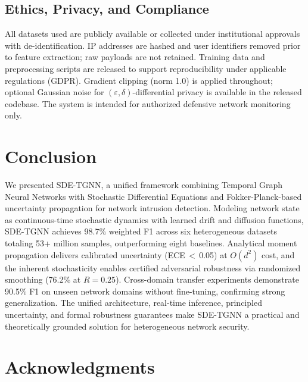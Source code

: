 \documentclass[10pt,journal,compsoc]{IEEEtran}
\begin{document}
\vspace{-0.2cm}
\subsection{Ethics, Privacy, and Compliance}

All datasets used are publicly available or collected under institutional approvals with de-identification. IP addresses are hashed and user identifiers removed prior to feature extraction; raw payloads are not retained. Training data and preprocessing scripts are released to support reproducibility under applicable regulations (GDPR). Gradient clipping (norm 1.0) is applied throughout; optional Gaussian noise for $(\varepsilon,\delta)$-differential privacy is available in the released codebase. The system is intended for authorized defensive network monitoring only.

\vspace{-0.2cm}
\section{Conclusion}
\label{sec:conclusion}

We presented SDE-TGNN, a unified framework combining Temporal Graph Neural Networks with Stochastic Differential Equations and Fokker-Planck-based uncertainty propagation for network intrusion detection. Modeling network state as continuous-time stochastic dynamics with learned drift and diffusion functions, SDE-TGNN achieves 98.7\% weighted F1 across six heterogeneous datasets totaling 53+ million samples, outperforming eight baselines. Analytical moment propagation delivers calibrated uncertainty (ECE\,$<$\,0.05) at $O(d^2)$ cost, and the inherent stochasticity enables certified adversarial robustness via randomized smoothing (76.2\% at $R{=}0.25$). Cross-domain transfer experiments demonstrate 90.5\% F1 on unseen network domains without fine-tuning, confirming strong generalization. The unified architecture, real-time inference, principled uncertainty, and formal robustness guarantees make SDE-TGNN a practical and theoretically grounded solution for heterogeneous network security.

\vspace{-0.2cm}
\section*{Acknowledgments}
\end{document}
